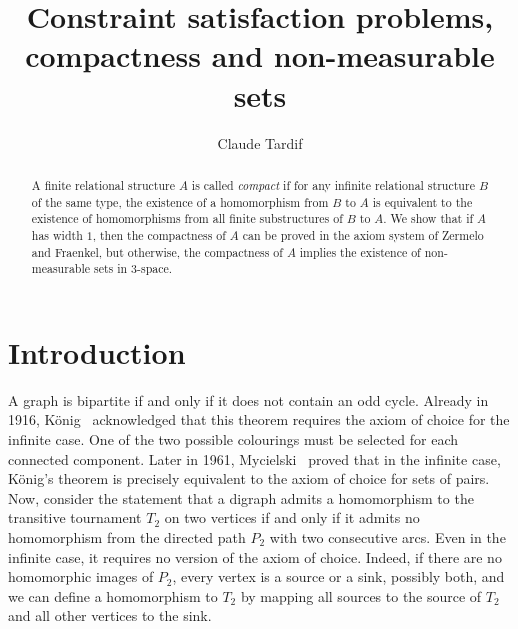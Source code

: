 \documentclass{lmcs}
\begin{document}
\title[Compactness and non-measurable sets]{Constraint satisfaction problems, compactness and non-measurable sets}
\author{Claude Tardif}
\address{Department of Mathematics and Computer Science,
Royal Military College of Canada,
Kingston, Ontario, Canada.}	

\begin{abstract}
A finite relational structure $A$ is called {\em compact} if 
for any infinite
relational structure $B$ of the same type, the existence 
of a homomorphism
from $B$ to $A$ is equivalent to the existence of homomorphisms 
from all finite
substructures of $B$ to $A$. We show that if $A$ has width $1$, 
then the compactness
of $A$ can be proved in the axiom system of Zermelo and Fraenkel,
but otherwise,
the compactness of $A$ implies the existence of non-measurable sets 
in $3$-space.
\end{abstract}

\maketitle
\section{Introduction} \label{intro}

A graph is bipartite if and only if it does not contain an odd cycle.
Already in 1916, K\"{o}nig~\cite{konig} acknowledged that this theorem requires the axiom
of choice for the infinite case. One of the two possible colourings must be selected for each
connected component. Later in 1961, Mycielski~\cite{mycielski} proved that in the infinite case, K\"{o}nig's theorem 
is precisely equivalent to the axiom of choice for sets of pairs. Now, consider the statement that a digraph admits a homomorphism
to the transitive tournament $T_2$ on two vertices if and only if it admits no homomorphism from the
directed path $P_2$ with two consecutive arcs. Even in the infinite case, it requires no version of the
axiom of choice. Indeed, if there are no homomorphic images of $P_2$, every vertex is a source or a sink, possibly both, 
and we can define a homomorphism to $T_2$ by mapping all sources to the source of $T_2$ and all other vertices to the sink.
\end{document}

